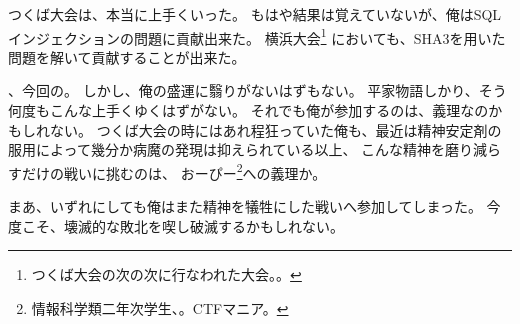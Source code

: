 つくば大会は、本当に上手くいった。
もはや結果は覚えていないが、俺はSQLインジェクションの問題に貢献出来た。
横浜大会\footnote{つくば大会の次の次に行なわれた大会。。}%
においても、SHA3を用いた問題を解いて貢献することが出来た。

、今回の。
しかし、俺の盛運に翳りがないはずもない。
平家物語しかり、そう何度もこんな上手くゆくはずがない。
それでも俺が参加するのは、義理なのかもしれない。
つくば大会の時にはあれ程狂っていた俺も、最近は精神安定剤の服用によって幾分か病魔の発現は抑えられている以上、
こんな精神を磨り減らすだけの戦いに挑むのは、
おーぴー\footnote{情報科学類二年次学生、。CTFマニア。}への義理か。

まあ、いずれにしても俺はまた精神を犠牲にした戦いへ参加してしまった。
今度こそ、壊滅的な敗北を喫し破滅するかもしれない。
